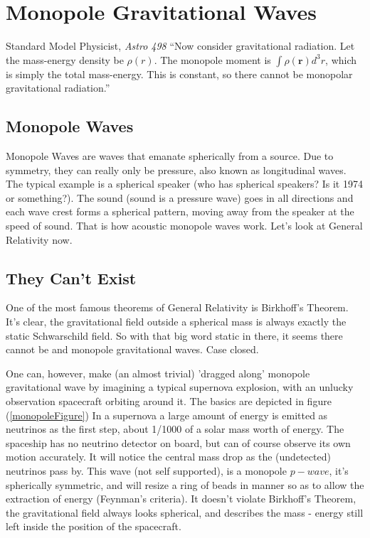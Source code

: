 \documentclass[../rzero]{subfiles}
\begin{document}
\chapter{Monopole Gravitational Waves}\label{monopoleGravitationalWavesChapter}

\begin{chapquote}{Standard Model Physicist, \textit{Astro 498\cite{Astronomy498}}}
``Now consider gravitational radiation. Let the mass-energy density be $\rho(r)$. The monopole moment is $\int \rho(\mathbf{r}) d^3 r$, which is simply the total mass-energy. This is constant, so there cannot be monopolar gravitational radiation.''
\end{chapquote}

\section{Monopole Waves}
Monopole Waves are waves that emanate spherically from a source. Due to symmetry, they can really only be pressure, also known as longitudinal waves. The typical example is a spherical speaker (who has spherical speakers? Is it 1974 or something?). The sound (sound is a pressure wave) goes in all directions and each wave crest forms a spherical pattern, moving away from the speaker at the speed of sound. That is how acoustic monopole waves work. Let's look at General Relativity now.

\section{They Can't Exist}
One of the most famous theorems of General Relativity is Birkhoff's Theorem\cite{Birkhoff1923}. It's clear, the gravitational field outside a spherical mass is always exactly the static Schwarschild field. So with that big word static in there, it seems there cannot be and monopole gravitational waves. Case closed. 

One can, however, make (an almost trivial) 'dragged along' monopole gravitational wave by imagining a typical supernova explosion, with an unlucky observation spacecraft orbiting around it. The basics are depicted in figure (\ref{monopoleFigure}) In a supernova a large amount of energy is emitted as neutrinos as the first step, about 1/1000 of a solar mass worth of energy. The spaceship has no neutrino detector on board, but can of course observe its own motion accurately. It will notice the central mass drop as the (undetected) neutrinos pass by. This wave (not self supported), is a monopole $p-wave$, it's spherically symmetric, and will resize a ring of beads in manner so as to allow the extraction of energy (Feynman's criteria). It doesn't violate Birkhoff's Theorem, the gravitational field always looks spherical, and describes the mass - energy still left inside the position of the spacecraft.
\end{document}
